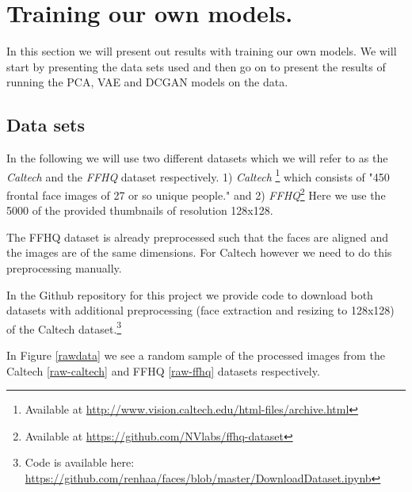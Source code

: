 \newpage
\section{Training our own models.} \label{training}

In this section we will present out results with training our own models. We will start by presenting the data sets used and then go on to present the results of running the  PCA, VAE and DCGAN models on the data.

\subsection{Data sets}
In the following we will use two different datasets which we will refer to as the \emph{Caltech} and the  \emph{FFHQ} dataset respectively. 1)  \emph{Caltech} \footnote{Available at \url{http://www.vision.caltech.edu/html-files/archive.html}} which consists of "450 frontal face images of 27 or so unique people." and 2) \emph{FFHQ}\footnote{Available at \url{https://github.com/NVlabs/ffhq-dataset}} Here we use the 5000 of the provided thumbnails of resolution 128x128.

The FFHQ dataset is already preprocessed such that the faces are aligned and the images are of the same dimensions. For Caltech however we need to do this preprocessing manually.

In the Github repository for this project we provide code to download both datasets with additional preprocessing  (face extraction and resizing to 128x128) of the Caltech dataset.\footnote{Code is available here: \url{https://github.com/renhaa/faces/blob/master/DownloadDataset.ipynb}}

In Figure \ref{rawdata} we see a random sample of the processed images from the Caltech \ref{raw-caltech} and FFHQ \ref{raw-ffhq} datasets respectively.

